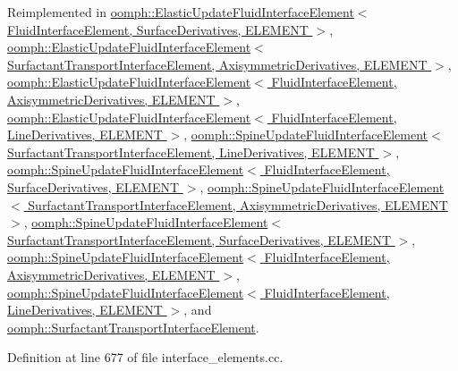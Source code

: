 Reimplemented in \hyperlink{classoomph_1_1ElasticUpdateFluidInterfaceElement_ac193aa64a8223a96e4148a5af456fb64}{oomph\+::\+Elastic\+Update\+Fluid\+Interface\+Element$<$ Fluid\+Interface\+Element, Surface\+Derivatives, E\+L\+E\+M\+E\+N\+T $>$}, \hyperlink{classoomph_1_1ElasticUpdateFluidInterfaceElement_ac193aa64a8223a96e4148a5af456fb64}{oomph\+::\+Elastic\+Update\+Fluid\+Interface\+Element$<$ Surfactant\+Transport\+Interface\+Element, Axisymmetric\+Derivatives, E\+L\+E\+M\+E\+N\+T $>$}, \hyperlink{classoomph_1_1ElasticUpdateFluidInterfaceElement_ac193aa64a8223a96e4148a5af456fb64}{oomph\+::\+Elastic\+Update\+Fluid\+Interface\+Element$<$ Fluid\+Interface\+Element, Axisymmetric\+Derivatives, E\+L\+E\+M\+E\+N\+T $>$}, \hyperlink{classoomph_1_1ElasticUpdateFluidInterfaceElement_ac193aa64a8223a96e4148a5af456fb64}{oomph\+::\+Elastic\+Update\+Fluid\+Interface\+Element$<$ Fluid\+Interface\+Element, Line\+Derivatives, E\+L\+E\+M\+E\+N\+T $>$}, \hyperlink{classoomph_1_1SpineUpdateFluidInterfaceElement_a3c9c00def11f68f48db0f46004f1e6fe}{oomph\+::\+Spine\+Update\+Fluid\+Interface\+Element$<$ Surfactant\+Transport\+Interface\+Element, Line\+Derivatives, E\+L\+E\+M\+E\+N\+T $>$}, \hyperlink{classoomph_1_1SpineUpdateFluidInterfaceElement_a3c9c00def11f68f48db0f46004f1e6fe}{oomph\+::\+Spine\+Update\+Fluid\+Interface\+Element$<$ Fluid\+Interface\+Element, Surface\+Derivatives, E\+L\+E\+M\+E\+N\+T $>$}, \hyperlink{classoomph_1_1SpineUpdateFluidInterfaceElement_a3c9c00def11f68f48db0f46004f1e6fe}{oomph\+::\+Spine\+Update\+Fluid\+Interface\+Element$<$ Surfactant\+Transport\+Interface\+Element, Axisymmetric\+Derivatives, E\+L\+E\+M\+E\+N\+T $>$}, \hyperlink{classoomph_1_1SpineUpdateFluidInterfaceElement_a3c9c00def11f68f48db0f46004f1e6fe}{oomph\+::\+Spine\+Update\+Fluid\+Interface\+Element$<$ Surfactant\+Transport\+Interface\+Element, Surface\+Derivatives, E\+L\+E\+M\+E\+N\+T $>$}, \hyperlink{classoomph_1_1SpineUpdateFluidInterfaceElement_a3c9c00def11f68f48db0f46004f1e6fe}{oomph\+::\+Spine\+Update\+Fluid\+Interface\+Element$<$ Fluid\+Interface\+Element, Axisymmetric\+Derivatives, E\+L\+E\+M\+E\+N\+T $>$}, \hyperlink{classoomph_1_1SpineUpdateFluidInterfaceElement_a3c9c00def11f68f48db0f46004f1e6fe}{oomph\+::\+Spine\+Update\+Fluid\+Interface\+Element$<$ Fluid\+Interface\+Element, Line\+Derivatives, E\+L\+E\+M\+E\+N\+T $>$}, and \hyperlink{classoomph_1_1SurfactantTransportInterfaceElement_aebc3ed4954b636f4992a212c7973c670}{oomph\+::\+Surfactant\+Transport\+Interface\+Element}.



Definition at line 677 of file interface\+\_\+elements.\+cc.



